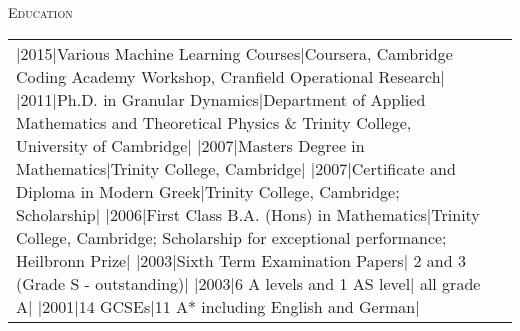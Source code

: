 \documentclass[a4paper,10pt]{article}
\newcommand{\lineunder}{\vspace*{0.2cm} \\ \hspace*{-20pt} \hrulefill \\ \vspace{-0.9cm}}
\newcommand{\header}[1]{{\hspace*{-17pt}\vspace*{6pt} \large{\textsc{#1}}}}
\newenvironment{cvsection}[1][]%
{%
  \header{#1}

  \begin{tabular}{p{0.8in}p{5.3in}}
}
{
  \end{tabular}
  \newline
  \lineunder
}
\begin{document}

  

\begin{cvsection}[Education]
\R 2013|2015|Various Machine Learning Courses|Coursera, Cambridge Coding Academy Workshop, Cranfield Operational Research|
\R 2007|2011|Ph.D. in Granular Dynamics|Department of Applied Mathematics and Theoretical Physics \& Trinity College, University of Cambridge|
\R 2006|2007|Masters Degree in Mathematics|Trinity College, Cambridge|
\R 2005|2007|Certificate and Diploma in Modern Greek|Trinity College, Cambridge;
Scholarship|
\R 2003|2006|First Class B.A. (Hons) in Mathematics|Trinity College, Cambridge;
Scholarship for exceptional performance; Heilbronn Prize|
\R 2002|2003|Sixth Term Examination Papers| 2 and 3 (Grade S - outstanding)|
\R 2001|2003|6 A levels and 1 AS level| all grade A|
\R 1996|2001|14 GCSEs|11 A* including English and German|
\end{cvsection}
\end{document}
